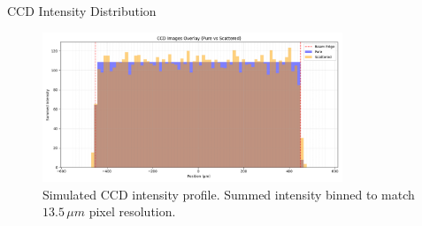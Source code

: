 \documentclass[aspectratio=169,xcolor=dvipsnames]{beamer}
\begin{document}
\begin{frame}{CCD Intensity Distribution}
  \begin{figure}[h!]
    \centering
    \includegraphics[width=0.8\textwidth]{CCD_Overlay_new.png}
    \caption{Simulated CCD intensity profile. Summed intensity binned to match $13.5\,\mu m$ pixel resolution.}
  \end{figure}
\end{frame}
\end{document}
